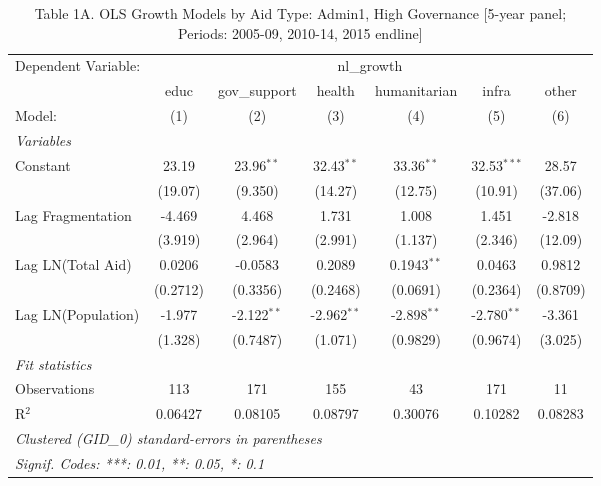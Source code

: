 
\begin{table}[H]
   \caption{Table 1A. OLS Growth Models by Aid Type: Admin1, High Governance [5-year panel; Periods: 2005-09, 2010-14, 2015 endline]}
   \centering
   \begin{tabular}{lcccccc}
      \tabularnewline \midrule \midrule
      Dependent Variable: & \multicolumn{6}{c}{nl\_growth}\\
                         & educ     & gov\_support  & health        & humanitarian  & infra         & other \\   
      Model:             & (1)      & (2)           & (3)           & (4)           & (5)           & (6)\\  
      \midrule
      \emph{Variables}\\
      Constant           & 23.19    & 23.96$^{**}$  & 32.43$^{**}$  & 33.36$^{**}$  & 32.53$^{***}$ & 28.57\\   
                         & (19.07)  & (9.350)       & (14.27)       & (12.75)       & (10.91)       & (37.06)\\   
      Lag Fragmentation  & -4.469   & 4.468         & 1.731         & 1.008         & 1.451         & -2.818\\   
                         & (3.919)  & (2.964)       & (2.991)       & (1.137)       & (2.346)       & (12.09)\\   
      Lag LN(Total Aid)  & 0.0206   & -0.0583       & 0.2089        & 0.1943$^{**}$ & 0.0463        & 0.9812\\   
                         & (0.2712) & (0.3356)      & (0.2468)      & (0.0691)      & (0.2364)      & (0.8709)\\   
      Lag LN(Population) & -1.977   & -2.122$^{**}$ & -2.962$^{**}$ & -2.898$^{**}$ & -2.780$^{**}$ & -3.361\\   
                         & (1.328)  & (0.7487)      & (1.071)       & (0.9829)      & (0.9674)      & (3.025)\\   
      \midrule
      \emph{Fit statistics}\\
      Observations       & 113      & 171           & 155           & 43            & 171           & 11\\  
      R$^2$              & 0.06427  & 0.08105       & 0.08797       & 0.30076       & 0.10282       & 0.08283\\  
      \midrule \midrule
      \multicolumn{7}{l}{\emph{Clustered (GID\_0) standard-errors in parentheses}}\\
      \multicolumn{7}{l}{\emph{Signif. Codes: ***: 0.01, **: 0.05, *: 0.1}}\\
   \end{tabular}
\end{table}



